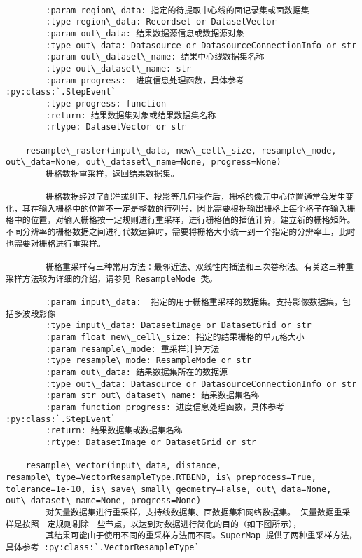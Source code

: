 \documentclass[11pt]{article}
\begin{document}
\begin{Verbatim}[commandchars=\\\{\}]
        
        :param region\_data: 指定的待提取中心线的面记录集或面数据集
        :type region\_data: Recordset or DatasetVector
        :param out\_data: 结果数据源信息或数据源对象
        :type out\_data: Datasource or DatasourceConnectionInfo or str
        :param out\_dataset\_name: 结果中心线数据集名称
        :type out\_dataset\_name: str
        :param progress:  进度信息处理函数，具体参考 :py:class:`.StepEvent`
        :type progress: function
        :return: 结果数据集对象或结果数据集名称
        :rtype: DatasetVector or str
    
    resample\_raster(input\_data, new\_cell\_size, resample\_mode, out\_data=None, out\_dataset\_name=None, progress=None)
        栅格数据重采样，返回结果数据集。
        
        栅格数据经过了配准或纠正、投影等几何操作后，栅格的像元中心位置通常会发生变化，其在输入栅格中的位置不一定是整数的行列号，因此需要根据输出栅格上每个格子在输入栅格中的位置，对输入栅格按一定规则进行重采样，进行栅格值的插值计算，建立新的栅格矩阵。不同分辨率的栅格数据之间进行代数运算时，需要将栅格大小统一到一个指定的分辨率上，此时也需要对栅格进行重采样。
        
        栅格重采样有三种常用方法：最邻近法、双线性内插法和三次卷积法。有关这三种重采样方法较为详细的介绍，请参见 ResampleMode 类。
        
        :param input\_data:  指定的用于栅格重采样的数据集。支持影像数据集，包括多波段影像
        :type input\_data: DatasetImage or DatasetGrid or str
        :param float new\_cell\_size: 指定的结果栅格的单元格大小
        :param resample\_mode: 重采样计算方法
        :type resample\_mode: ResampleMode or str
        :param out\_data: 结果数据集所在的数据源
        :type out\_data: Datasource or DatasourceConnectionInfo or str
        :param str out\_dataset\_name: 结果数据集名称
        :param function progress: 进度信息处理函数，具体参考 :py:class:`.StepEvent`
        :return: 结果数据集或数据集名称
        :rtype: DatasetImage or DatasetGrid or str
    
    resample\_vector(input\_data, distance, resample\_type=VectorResampleType.RTBEND, is\_preprocess=True, tolerance=1e-10, is\_save\_small\_geometry=False, out\_data=None, out\_dataset\_name=None, progress=None)
        对矢量数据集进行重采样，支持线数据集、面数据集和网络数据集。 矢量数据重采样是按照一定规则剔除一些节点，以达到对数据进行简化的目的（如下图所示），
        其结果可能由于使用不同的重采样方法而不同。SuperMap 提供了两种重采样方法，具体参考 :py:class:`.VectorResampleType`
        

\end{Verbatim}
\end{document}
